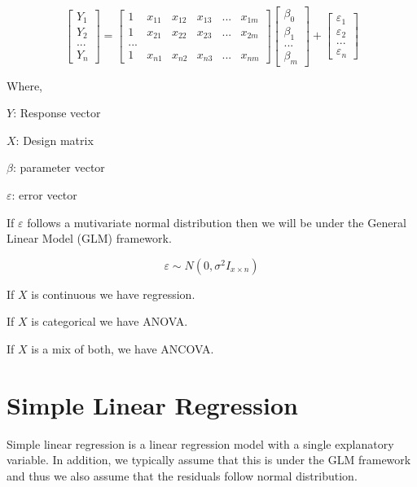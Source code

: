 \documentclass[]{book}
\begin{document}
\[\begin{bmatrix}
Y_1 \\
Y_2  \\
...\\
Y_n \end{bmatrix}=\begin{bmatrix}
1 & x_{11} & x_{12} & x_{13} & ... & x_{1m}\\
1 & x_{21} & x_{22} & x_{23} & ... & x_{2m} \\
...\\
1 & x_{n1} & x_{n2} & x_{n3} & ... & x_{nm}
\end{bmatrix} \begin{bmatrix}
\beta_0 \\
\beta_1  \\
...\\
\beta_m \end{bmatrix}+\begin{bmatrix}
\varepsilon_1 \\ \varepsilon_2 \\
...\\
\varepsilon_n  \end{bmatrix}\]

Where,

\(Y\): Response vector

\(X\): Design matrix

\(\beta\): parameter vector

\(\varepsilon\): error vector

If \(\varepsilon\) follows a mutivariate normal distribution then we will be under the General Linear Model (GLM) framework.

\[\varepsilon \sim N(0, \sigma^2I_{x \times n})\]

If \(X\) is continuous we have regression.

If \(X\) is categorical we have ANOVA.

If \(X\) is a mix of both, we have ANCOVA.

\hypertarget{simple-linear-regression}{%
\section{Simple Linear Regression}\label{simple-linear-regression}}

Simple linear regression is a linear regression model with a single explanatory variable. In addition, we typically assume that this is under the GLM framework and thus we also assume that the residuals follow normal distribution.
\end{document}
